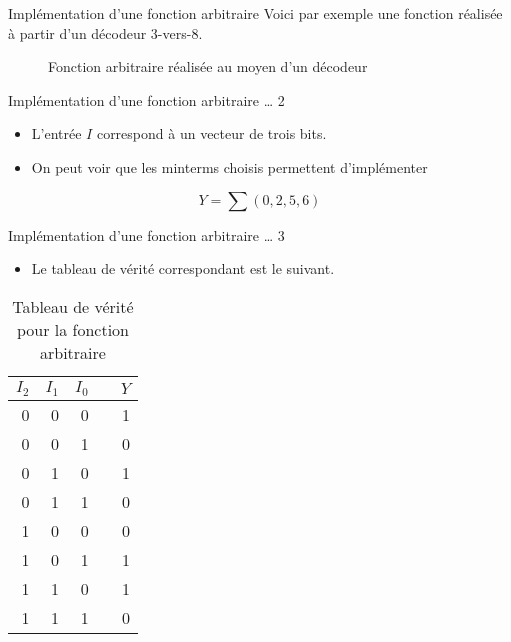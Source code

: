 \documentclass[presentation]{beamer}
\begin{document}
\begin{frame}[label={sec:org30c030b}]{Implémentation d'une fonction arbitraire}
Voici par exemple une fonction réalisée à partir d'un décodeur 3-vers-8.

\begin{figure}[htbp]
\centering

\caption{\label{fig:org7ca56e2}Fonction arbitraire réalisée au moyen d'un décodeur}
\end{figure}
\end{frame}


\begin{frame}[label={sec:org413ac52}]{Implémentation d'une fonction arbitraire \ldots{} 2}
\begin{itemize}
\item L'entrée \(I\) correspond à un vecteur de trois bits.

\item On peut voir que les minterms choisis permettent d'implémenter
\end{itemize}

$$ Y = \sum(0,2,5,6)$$
\end{frame}


\begin{frame}[label={sec:org57a4f70}]{Implémentation d'une fonction arbitraire \ldots{} 3}
\begin{itemize}
\item Le tableau de vérité correspondant est le suivant.
\end{itemize}

\begin{table}[htbp]
\caption{\label{tab:orgbe6e0f7}Tableau de vérité pour la fonction arbitraire}
\centering
\begin{tabular}{rrrlr}
\(I_2\) & \(I_1\) & \(I_0\) &  & \(Y\)\\
\hline
0 & 0 & 0 &  & 1\\
0 & 0 & 1 &  & 0\\
0 & 1 & 0 &  & 1\\
0 & 1 & 1 &  & 0\\
1 & 0 & 0 &  & 0\\
1 & 0 & 1 &  & 1\\
1 & 1 & 0 &  & 1\\
1 & 1 & 1 &  & 0\\
\end{tabular}
\end{table}
\end{frame}
\end{document}
